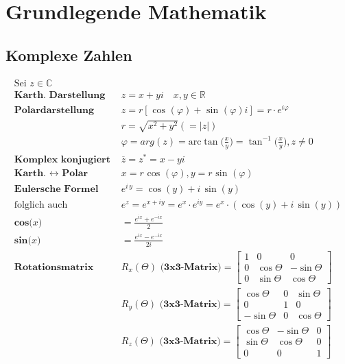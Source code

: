 \documentclass[8pt]{article}
\begin{document}
	\section{Grundlegende Mathematik}
		\subsection{Komplexe Zahlen}
			\begin{align*}
				\text{Sei }z \in \mathbb{C} \text{ }& \\
				\textbf{Karth. Darstellung } 			& z = x + yi \quad x, y \in \mathbb{R} \\
				\textbf{Polardarstellung } 				& z = r [ \text{ cos }(\varphi) + \text{ sin }(\varphi)i ] = r \cdot e^{i \varphi} \\
														& r = \sqrt{x^2 + y^2} (= |z|) \\
														& \varphi = arg(z) = \text{arc}\tan \Big(\frac{x}{y}\Big) = \tan^{-1} \Big(\frac{x}{y}\Big), z \neq 0 \\
				\textbf{Komplex konjugiert } 			& \overline{z} = z^{*} = x - yi \\
				\textbf{Karth. $\leftrightarrow$ Polar }& x = r \text{ cos }(\varphi), y = r \text{ sin }(\varphi) \\
				\textbf{Eulersche Formel } 				& {{e} ^{{i} \,y}=\cos \left(y\right)+ {i} \,\sin \left(y\right)}\\
				\text{folglich auch }  						&{{e} ^{z}= {e} ^{x+{i} y}= {e} ^{x}\cdot {e} ^{ {i} y}= {e} ^{x}\cdot \left(\cos \left(y\right)+{i} \,\sin \left(y\right)\right)}\\
				\textbf{cos($x$) } 						& = \frac{e^{i x} + e^{-i x}}{2}\\
				\textbf{sin($x$) } 						& = \frac{e^{i x} - e^{-i x}}{2i}\\
				\textbf{Rotationsmatrix }				& \textbf{$R_x\left(\Theta\right)$ (3x3-Matrix)} = \begin{bmatrix}1 & 0 & 0 \\
																											0 & \cos \Theta & -\sin \Theta \\
																											0 & \sin \Theta & \cos \Theta \end{bmatrix}\\
														& \textbf{$R_y\left(\Theta\right)$ (3x3-Matrix)} = \begin{bmatrix}\cos \Theta & 0 & \sin \Theta \\
																											0 & 1 & 0 \\
																											 -\sin \Theta & 0 & \cos \Theta \end{bmatrix}\\
														& \textbf{$R_z\left(\Theta\right)$ (3x3-Matrix)} = \begin{bmatrix}\cos \Theta & -\sin \Theta & 0 \\
																											\sin \Theta & \cos \Theta & 0\\
																											0 & 0 & 1 \end{bmatrix}\\
			\end{align*}
\end{document}
